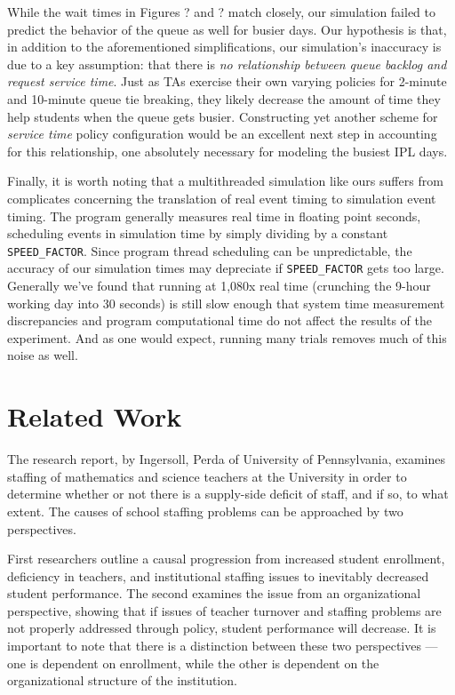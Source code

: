\documentclass{article}
\begin{document}
\begin{multicols}{2}
While the wait times in Figures ? and ? match closely, our simulation failed to predict the behavior of the queue as well for busier days. Our hypothesis is that, in addition to the aforementioned simplifications, our simulation's inaccuracy is due to a key assumption: that there is \textit{no relationship between queue backlog and request service time}. Just as TAs exercise their own varying policies for 2-minute and 10-minute queue tie breaking, they likely decrease the amount of time they help students when the queue gets busier. Constructing yet another scheme for 
\textit{service time} policy configuration would be an excellent next step in accounting for this relationship, one absolutely necessary for modeling the busiest IPL days.

Finally, it is worth noting that a multithreaded simulation like ours suffers from complicates concerning the translation of real event timing to simulation event timing. The program generally measures real time in floating point seconds, scheduling events in simulation time by simply dividing by a constant \texttt{SPEED\_FACTOR}. Since program thread scheduling can be unpredictable, the accuracy of our simulation times may depreciate if \texttt{SPEED\_FACTOR} gets too large. Generally we've found that running at 1,080x real time (crunching the 9-hour working day into 30 seconds) is still slow enough that system time measurement discrepancies and program computational time do not affect the results of the experiment. And as one would expect, running many trials removes much of this noise as well.

\section*{Related Work}

The research report,  by Ingersoll, Perda of University of Pennsylvania, examines staffing of mathematics and science teachers at the University in order to determine whether or not there is a supply-side deficit of staff, and if so, to what extent. The causes of school staffing problems can be approached by two perspectives.

First researchers outline a causal progression from increased student enrollment, deficiency in teachers, and institutional staffing issues to inevitably decreased student performance. The second examines the issue from an organizational perspective, showing that if issues of teacher turnover and staffing problems are not properly addressed through policy, student performance will decrease. It is important to note that there is a distinction between these two perspectives — one is dependent on enrollment, while the other is dependent on the organizational structure of the institution. 


\end{multicols}
\end{document}
